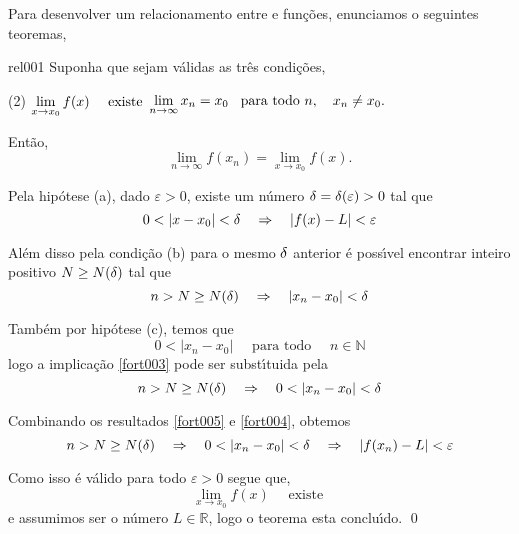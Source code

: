 Para desenvolver um relacionamento entre \seqs e fun\c{c}\~{o}es, enunciamos o seguintes teoremas,

\begin{theoc}{}{rel001}
Suponha que sejam v\'{a}lidas as tr\^{e}s condi\c{c}\~{o}es,
\begin{tasks}[label=\rm{(\alph*)},item-indent=4em,label-width=4ex,ref=\rm{(\alph*)}](2)
\task  \(\displaystyle \lim_{x\to x_0}f(x)\quad \text{ existe}\)
\task  \(\displaystyle \lim_{n\to \infty} x_n=x_0\)
\task  \(\displaystyle \text{ para todo } n,\quad x_n\neq x_0.\)
\end{tasks}
Ent\~{a}o,
\begin{equation*}
    \lim_{n\to \infty}f(x_n)=\lim_{x\to x_0}f(x).
\end{equation*}
\end{theoc}

\prova Pela hip\'{o}tese (a), dado $\varepsilon>0$, existe um n\'{u}mero $\delta=\delta(\varepsilon)>0$ tal que
\begin{equation}\label{fort005}
    0<|x-x_0|<\de \quad \Rightarrow \quad |f(x)-L|<\varepsilon
\end{equation}

Al\'{e}m disso pela condi\c{c}\~{a}o (b) para o mesmo $\delta$ anterior \'{e} poss\'{\i}vel encontrar inteiro positivo $N\geq N(\delta)$ tal que
\begin{equation}\label{fort003}
    n>N\geq N(\delta) \quad \Rightarrow \quad |x_n-x_0|<\delta
\end{equation}

Tamb\'{e}m por hip\'{o}tese (c), temos  que
\begin{equation*}
    0<|x_n-x_0|\quad \text{ para todo } \quad n\in \mathbb{N}
\end{equation*}
logo a implica\c{c}\~{a}o \eqref{fort003} pode ser subst\'{\i}tuida pela
\begin{equation}\label{fort004}
    n>N\geq N(\de) \quad \Rightarrow \quad 0<|x_n-x_0|<\de
\end{equation}

Combinando os resultados \eqref{fort005} e \eqref{fort004}, obtemos
\begin{equation*}
    n>N \geq N(\de) \quad \Rightarrow \quad 0<|x_n-x_0|<\de\quad \Rightarrow \quad |f(x_n)-L|<\varepsilon
\end{equation*}

Como isso \'{e} v\'{a}lido para todo $\varepsilon>0$ segue que,
\begin{equation*}
    \lim_{x\to x_0}f(x)\quad \text{ existe }
\end{equation*}
e assumimos ser o n\'{u}mero $L\in \mathbb{R}$, logo o teorema esta conclu\'{\i}do. \qed

